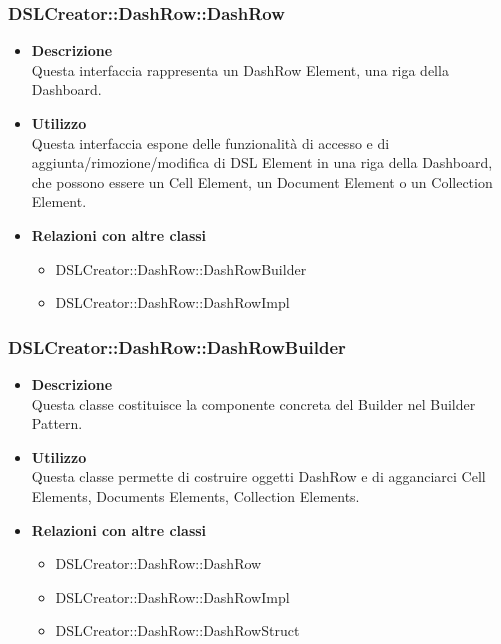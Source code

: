                 \subsubsection{DSLCreator::DashRow::DashRow}
                    \begin{itemize}
                        \item \textbf{Descrizione} \hfill \\
                            Questa interfaccia rappresenta un DashRow Element, una riga della Dashboard.
                        \item \textbf{Utilizzo} \hfill \\
                            Questa interfaccia espone delle funzionalità di accesso e di aggiunta/rimozione/modifica di DSL Element in una riga della Dashboard, che possono essere un Cell Element, un Document Element o un Collection Element. 
                        \item \textbf{Relazioni con altre classi}
                            \begin{itemize}
                              \item DSLCreator::DashRow::DashRowBuilder
                              \item DSLCreator::DashRow::DashRowImpl
                            \end{itemize}
                    \end{itemize}

                \subsubsection{DSLCreator::DashRow::DashRowBuilder}
                    \begin{itemize}
                        \item \textbf{Descrizione} \hfill \\
                            Questa classe costituisce la componente concreta del Builder nel Builder Pattern.
                        \item \textbf{Utilizzo} \hfill \\
                            Questa classe permette di costruire oggetti DashRow e di agganciarci Cell Elements, Documents Elements, Collection Elements.
                        \item \textbf{Relazioni con altre classi}
                            \begin{itemize}
                              \item DSLCreator::DashRow::DashRow
                              \item DSLCreator::DashRow::DashRowImpl
                              \item DSLCreator::DashRow::DashRowStruct
                            \end{itemize}
                    \end{itemize}

